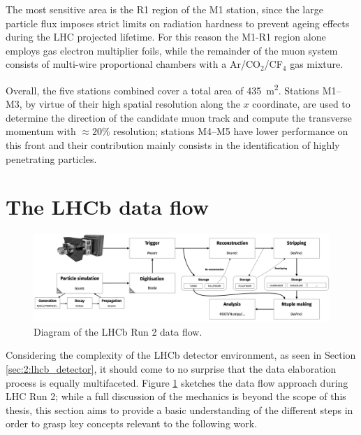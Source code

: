 The most sensitive area is the R1 region of the M1 station, since the large particle flux imposes strict limits on radiation hardness to prevent ageing effects during the LHC projected lifetime.
For this reason the M1-R1 region alone employs gas electron multiplier foils, while the remainder of the muon system consists of multi-wire proportional chambers with a Ar/CO$_2$/CF$_4$ gas mixture.

Overall, the five stations combined cover a total area of \SI{435}{\meter\squared}. Stations M1--M3, by virtue of their high spatial resolution along the $x$ coordinate, are used to determine the direction of the candidate muon track and compute the transverse momentum with $\approx 20\%$ resolution;
stations M4--M5 have lower performance on this front and their contribution mainly consists in the identification of highly penetrating particles.

\section{The LHCb data flow}
\label{sec:2:data_flow}

\begin{figure}[t]
	\centering
	\includegraphics[width=\textwidth]{graphics/02-lhcb/lhcb_run_2_data_flow.png}
	\caption{Diagram of the LHCb Run 2 data flow.}
	\label{fig:2:lhcb_data_flow}
\end{figure}

Considering the complexity of the LHCb detector environment, as seen in Section \ref{sec:2:lhcb_detector}, it should come to no surprise that the data elaboration process is equally multifaceted.
Figure \ref{fig:2:lhcb_data_flow} sketches the data flow approach during LHC Run 2;
while a full discussion of the mechanics is beyond the scope of this thesis, this section aims to provide a basic understanding of the different steps in order to grasp key concepts relevant to the following work.

